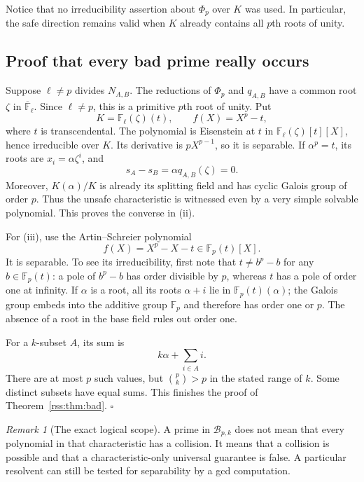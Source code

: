 \documentclass[11pt,a4paper]{article}
\theoremstyle{definition}
\theoremstyle{remark}
\newtheorem{remark}[theorem]{Remark}
\newcommand{\F}{\mathbb F}
\begin{document}
Notice that no irreducibility assertion about $\Phi_p$ over $K$ was used.
In particular, the safe direction remains valid when $K$ already contains
all $p$th roots of unity.

\subsection{Proof that every bad prime really occurs}

Suppose $\ell\neq p$ divides $N_{A,B}$. The reductions of $\Phi_p$ and
$q_{A,B}$ have a common root $\zeta$ in $\overline{\F}_\ell$. Since
$\ell\neq p$, this is a primitive $p$th root of unity. Put
\[
 K=\F_\ell(\zeta)(t),\qquad f(X)=X^p-t,
\]
where $t$ is transcendental. The polynomial is Eisenstein at $t$ in
$\F_\ell(\zeta)[t][X]$, hence irreducible over $K$. Its derivative is
$pX^{p-1}$, so it is separable. If $\alpha^p=t$, its roots are
$x_i=\alpha\zeta^i$, and
\[
 s_A-s_B=\alpha q_{A,B}(\zeta)=0.
\]
Moreover, $K(\alpha)/K$ is already its splitting field and has cyclic
Galois group of order $p$. Thus the unsafe characteristic is witnessed even
by a very simple solvable polynomial. This proves the converse in (ii).

For (iii), use the Artin--Schreier polynomial
\[
 f(X)=X^p-X-t\in\F_p(t)[X].
\]
It is separable. To see its irreducibility, first note that
$t\neq b^p-b$ for any $b\in\F_p(t)$: a pole of $b^p-b$ has order divisible
by $p$, whereas $t$ has a pole of order one at infinity. If $\alpha$ is a
root, all its roots $\alpha+i$ lie in $\F_p(t)(\alpha)$; the Galois group
embeds into the additive group $\F_p$ and therefore has order one or $p$.
The absence of a root in the base field rules out order one.

For a $k$-subset $A$, its sum is
\[
 k\alpha+\sum_{i\in A}i.
\]
There are at most $p$ such values, but $\binom pk>p$ in the stated range of
$k$. Some distinct subsets have equal sums. This finishes the proof of
Theorem~\ref{rss:thm:bad}. \hfill$\square$

\begin{remark}[The exact logical scope]
A prime in $\mathcal B_{p,k}$ does not mean that every polynomial in that
characteristic has a collision. It means that a collision is possible and
that a characteristic-only universal guarantee is false. A particular
resolvent can still be tested for separability by a gcd computation.
\end{remark}
\end{document}
